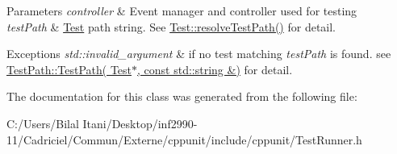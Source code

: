 \begin{DoxyParams}{Parameters}
{\em controller} & Event manager and controller used for testing \\
\hline
{\em test\+Path} & \hyperlink{class_test}{Test} path string. See \hyperlink{class_test_aaa1f5a8b47a9ad4feed4603c7e56758c}{Test\+::resolve\+Test\+Path()} for detail. \\
\hline
\end{DoxyParams}

\begin{DoxyExceptions}{Exceptions}
{\em std\+::invalid\+\_\+argument} & if no test matching {\itshape test\+Path} is found. see \hyperlink{class_test_path_a5855701e39a328a19f9780a130106cb3}{Test\+Path\+::\+Test\+Path( Test$\ast$, const std\+::string \&)} for detail. \\
\hline
\end{DoxyExceptions}


The documentation for this class was generated from the following file\+:\begin{DoxyCompactItemize}
\item 
C\+:/\+Users/\+Bilal Itani/\+Desktop/inf2990-\/11/\+Cadriciel/\+Commun/\+Externe/cppunit/include/cppunit/Test\+Runner.\+h\end{DoxyCompactItemize}
